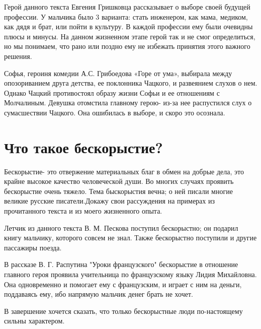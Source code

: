 \documentclass[12pt, letterpaper]{article}
\begin{document}
Герой данного текста Евгения Гришковца рассказывает о выборе своей будущей профессии. У мальчика было 3 варианта: стать инженером, как мама, медиком, как дядя и брат, или пойти в культуру. В каждой профессии ему были очевидны плюсы и минусы. На данном жизненном этапе герой так и не смог определиться, но мы понимаем, что рано или поздно ему не избежать принятия этого важного решения. 

Софья, героиня комедии А.С. Грибоедова «Горе от ума», выбирала между опозориванием друга детства, ее поклонника Чацкого, и развеянием слухов о нем. Однако Чацкий противостоял образу жизни Софьи и ее                                                                                                                                                                                                                           отношениям с Молчалиным. Девушка отомстила главному герою- из-за нее распустился слух о сумасшествии Чацкого. Она ошибилась в выборе, и скоро это осознала.

\section{Что такое бескорыстие?}
Бескорыстие- это отвержение материальных благ в обмен на добрые дела, это крайне высокое качество человеческой души. Во многих случаях проявить бескорыстие очень тяжело. Тема быскорыстия вечна; о ней писали многие великие русские писатели.Докажу свои рассуждения на примерах из прочитанного текста и из моего жизненного опыта.

Летчик из данного текста В. М. Пескова поступил бескорыстно; он подарил книгу мальчику, которого совсем не знал. Также бескорыстно поступили и другие пассажиры поезда.

В рассказе В. Г. Распутина "Уроки французского" бескорыстие в отношение главного героя проявила учительница по французскому языку Лидия Михайловна. Она одновременно и помогает ему с французским, и играет с ним на деньги, поддаваясь ему, ибо напрямую мальчик денег брать не хочет.

В завершение хочется сказать, что только бескорыстные люди по-настоящему сильны характером.
\end{document}
